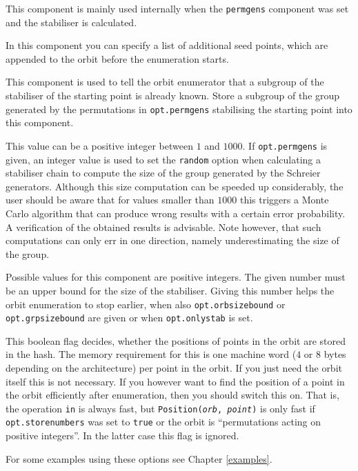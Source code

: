 \documentclass[a4paper,11pt]{report}
\begin{document}
{{{\begin{description}
 This component is mainly used internally when the \texttt{permgens} component was set and the stabiliser is calculated.
\item[{\texttt{seeds}}] In this component you can specify a list of additional seed points, which are
appended to the orbit before the enumeration starts. 
\item[{\texttt{stab}}] This component is used to tell the orbit enumerator that a subgroup of the
stabiliser of the starting point is already known. Store a subgroup of the
group generated by the permutations in \texttt{opt.permgens} stabilising the starting point into this component.
\item[{\texttt{stabchainrandom}}] This value can be a positive integer between $1$ and $1000$. If \texttt{opt.permgens} is given, an integer value is used to set the \texttt{random} option when calculating a stabiliser chain to compute the size of the group
generated by the Schreier generators. Although this size computation can be
speeded up considerably, the user should be aware that for values smaller than $1000$ this triggers a Monte Carlo algorithm that can produce wrong results with a
certain error probability. A verification of the obtained results is
advisable. Note however, that such computations can only err in one direction,
namely underestimating the size of the group.
\item[{\texttt{stabsizebound}}] Possible values for this component are positive integers. The given number
must be an upper bound for the size of the stabiliser. Giving this number
helps the orbit enumeration to stop earlier, when also \texttt{opt.orbsizebound} or \texttt{opt.grpsizebound} are given or when \texttt{opt.onlystab} is set.
\item[{\texttt{storenumbers}}] This boolean flag decides, whether the positions of points in the orbit are
stored in the hash. The memory requirement for this is one machine word ($4$ or $8$ bytes depending on the architecture) per point in the orbit. If you just need
the orbit itself this is not necessary. If you however want to find the
position of a point in the orbit efficiently after enumeration, then you
should switch this on. That is, the operation \texttt{\texttt{}in} is always fast, but \texttt{Position(\mbox{\texttt{\mdseries\slshape orb}}, \mbox{\texttt{\mdseries\slshape point}})} is only fast if \texttt{opt.storenumbers} was set to \texttt{true} or the orbit is ``permutations acting on positive integers''. In the latter case this flag is ignored.
\end{description}
 For some examples using these options see Chapter \ref{examples}. }

}}
\end{document}
